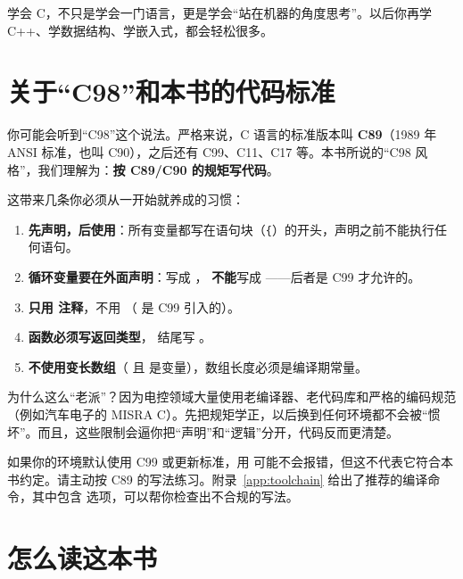 学会 C，不只是学会一门语言，更是学会“站在机器的角度思考”。以后你再学 C++、学数据结构、学嵌入式，都会轻松很多。

\section*{关于“C98”和本书的代码标准}

你可能会听到“C98”这个说法。严格来说，C 语言的标准版本叫 \textbf{C89}（1989 年 ANSI 标准，也叫 C90），之后还有 C99、C11、C17 等。本书所说的“C98 风格”，我们理解为：\textbf{按 C89/C90 的规矩写代码}。

这带来几条你必须从一开始就养成的习惯：

\begin{c89box}
\begin{enumerate}
  \item \textbf{先声明，后使用}：所有变量都写在语句块（\texttt{\{}）的开头，声明之前不能执行任何语句。
  \item \textbf{循环变量要在外面声明}：写成
        ，
        \textbf{不能}写成 ——后者是 C99 才允许的。
  \item \textbf{只用 \code{/* */} 注释}，不用 \code{//}（\code{//} 是 C99 引入的）。
  \item \textbf{函数必须写返回类型}， 结尾写 。
  \item \textbf{不使用变长数组}（ 且  是变量），数组长度必须是编译期常量。
\end{enumerate}
\end{c89box}

为什么这么“老派”？因为电控领域大量使用老编译器、老代码库和严格的编码规范（例如汽车电子的 MISRA C）。先把规矩学正，以后换到任何环境都不会被“惯坏”。而且，这些限制会逼你把“声明”和“逻辑”分开，代码反而更清楚。

\begin{tipbox}[如果你的编译器报错……]
如果你的环境默认使用 C99 或更新标准，用  可能不会报错，但这不代表它符合本书约定。请主动按 C89 的写法练习。附录~\ref{app:toolchain} 给出了推荐的编译命令，其中包含  选项，可以帮你检查出不合规的写法。
\end{tipbox}

\section*{怎么读这本书}

